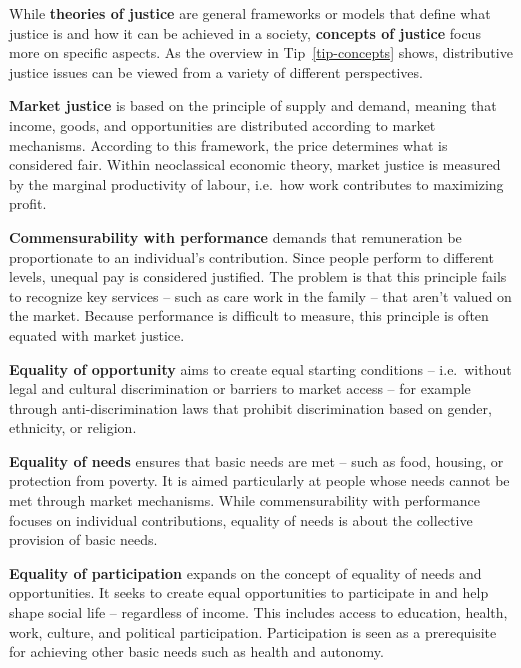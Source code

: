 \documentclass[
  a4paper,
  openany]{book}
\newcounter{quartocallouttipno}
\newcommand{\quartocallouttip}[1]{\refstepcounter{quartocallouttipno}\label{#1}}
\begin{document}
While \textbf{theories of justice} are general frameworks or models that
define what justice is and how it can be achieved in a society,
\textbf{concepts of justice} focus more on specific aspects. As the
overview in Tip~\ref{tip-concepts} shows, distributive justice issues
can be viewed from a variety of different perspectives.

\begin{tcolorbox}[enhanced jigsaw, coltitle=black, bottomtitle=1mm, opacitybacktitle=0.6, titlerule=0mm, opacityback=0, leftrule=.75mm, colbacktitle=quarto-callout-note-color!10!white, bottomrule=.15mm, toptitle=1mm, breakable, title={Note \ref*{tip-concepts}: Normative concepts of justice based on
(@novyZukunftsfaehigesWirtschaften2023)}, arc=.35mm, rightrule=.15mm, toprule=.15mm, left=2mm, colback=white, colframe=quarto-callout-note-color-frame]

\quartocallouttip{tip-concepts} 

\textbf{Market justice} is based on the principle of supply and demand,
meaning that income, goods, and opportunities are distributed according
to market mechanisms. According to this framework, the price determines
what is considered fair. Within neoclassical economic theory, market
justice is measured by the marginal productivity of labour, i.e.~how
work contributes to maximizing profit.

\textbf{Commensurability with performance} demands that remuneration be
proportionate to an individual's contribution. Since people perform to
different levels, unequal pay is considered justified. The problem is
that this principle fails to recognize key services -- such as care work
in the family -- that aren't valued on the market. Because performance
is difficult to measure, this principle is often equated with market
justice.

\textbf{Equality of opportunity} aims to create equal starting
conditions -- i.e.~without legal and cultural discrimination or barriers
to market access -- for example through anti-discrimination laws that
prohibit discrimination based on gender, ethnicity, or religion.

\textbf{Equality of needs} ensures that basic needs are met -- such as
food, housing, or protection from poverty. It is aimed particularly at
people whose needs cannot be met through market mechanisms. While
commensurability with performance focuses on individual contributions,
equality of needs is about the collective provision of basic needs.

\textbf{Equality of participation} expands on the concept of equality of
needs and opportunities. It seeks to create equal opportunities to
participate in and help shape social life -- regardless of income. This
includes access to education, health, work, culture, and political
participation. Participation is seen as a prerequisite for achieving
other basic needs such as health and autonomy.


\end{tcolorbox}
\end{document}
